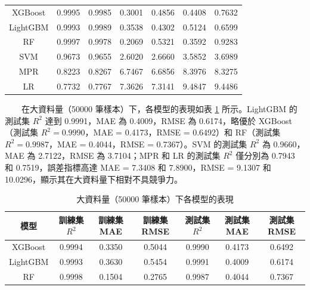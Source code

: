 \documentclass[12pt,a4paper]{article}
\begin{document}
\begin{enumerate}
\begin{enumerate}[label=\arabic*.]
\begin{enumerate}[label=3-2-\arabic*.]
\begin{enumerate}[label=\Alph*.]
\begin{table}[H]
\begin{tabular}{|c|c|c|c|c|c|c|}
                                \hline
                                XGBoost & 0.9995 & 0.9985 & 0.3001 & 0.4856 & 0.4408 & 0.7632 \\
                                LightGBM & 0.9993 & 0.9989 & 0.3538 & 0.4302 & 0.5124 & 0.6599 \\
                                RF & 0.9997 & 0.9978 & 0.2069 & 0.5321 & 0.3592 & 0.9283 \\
                                SVM & 0.9673 & 0.9655 & 2.6020 & 2.6660 & 3.5852 & 3.6989 \\
                                MPR & 0.8223 & 0.8267 & 6.7467 & 6.6856 & 8.3976 & 8.3275 \\
                                LR & 0.7732 & 0.7767 & 7.3626 & 7.3141 & 9.4847 & 9.4486 \\
                                \hline
                            \end{tabular}
                        \end{table}
                    　　在大資料量（50000 筆樣本）下，各模型的表現如表 \ref{table:large_data_50000} 所示。LightGBM 的測試集 \( R^2 \) 達到 0.9991，MAE 為 0.4009，RMSE 為 0.6174，略優於 XGBoost（測試集 \( R^2 = 0.9990 \)，MAE = 0.4173，RMSE = 0.6492）和 RF（測試集 \( R^2 = 0.9987 \)，MAE = 0.4044，RMSE = 0.7367）。SVM 的測試集 \( R^2 \) 為 0.9660，MAE 為 2.7122，RMSE 為 3.7104；MPR 和 LR 的測試集 \( R^2 \) 僅分別為 0.7943 和 0.7519，誤差指標高達 MAE = 7.3408 和 7.8900，RMSE = 9.1307 和 10.0296，顯示其在大資料量下相對不具競爭力。\\
                        \begin{table}[H]
                            \centering
                            \caption{大資料量（50000 筆樣本）下各模型的表現}
                            \label{table:large_data_50000}
                            \begin{tabular}{|c|c|c|c|c|c|c|}
                                \hline
                                模型 & 訓練集 \( R^2 \) & 訓練集 MAE & 訓練集 RMSE & 測試集 \( R^2 \) & 測試集 MAE & 測試集 RMSE \\
                                \hline
                                XGBoost & 0.9994 & 0.3350 & 0.5044 & 0.9990 & 0.4173 & 0.6492 \\
                                LightGBM & 0.9993 & 0.3630 & 0.5454 & 0.9991 & 0.4009 & 0.6174 \\
                                RF & 0.9998 & 0.1504 & 0.2765 & 0.9987 & 0.4044 & 0.7367 \\

\end{tabular}
\end{table}
\end{enumerate}
\end{enumerate}
\end{enumerate}
\end{enumerate}
\end{document}
